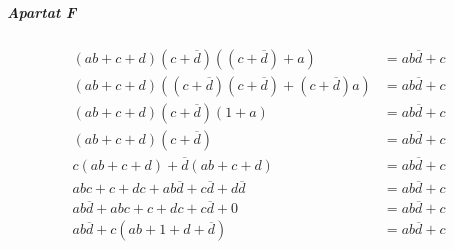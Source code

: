 \documentclass[catalan,border=15pt,class=scrartcl,multi=minipage]{standalone}
\begin{document}
\begin{minipage}{30em}
\subparagraph{Apartat F} \begin{align*}
  \left(ab + c + d\right)\left(c + \overline{d}\right)\left(\left(c + \overline{d}\right) + a\right) &= ab\overline{d} + c \\
  \left(ab + c + d\right)\left(\left(c + \overline{d}\right)\left(c + \overline{d}\right) + \left(c + \overline{d}\right)a\right) &= ab\overline{d} + c \\
  \left(ab + c + d\right)\left(c + \overline{d}\right)\left(1 + a\right) &= ab\overline{d} + c \\
  \left(ab + c + d\right)\left(c + \overline{d}\right) &= ab\overline{d} + c \\
  c\left(ab + c + d\right) + \overline{d}\left(ab + c + d\right) &= ab\overline{d} + c \\
  abc + c + dc + ab\overline{d} + c\overline{d} + d\overline{d} &= ab\overline{d} + c \\
  ab\overline{d} + abc + c + dc + c\overline{d} + 0 &= ab\overline{d} + c \\
  ab\overline{d} + c\left(ab + 1 + d + \overline{d}\right) &= ab\overline{d} + c
\end{align*}

\end{minipage}
\end{document}
